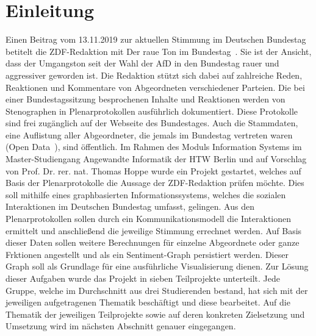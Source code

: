 \section{Einleitung}\label{sec:01_01_einleitung}
Einen Beitrag vom 13.11.2019 zur aktuellen Stimmung im Deutschen Bundestag betitelt die ZDF-Redaktion mit \glqq Der raue Ton im Bundestag\grqq{}~\cite{TonImBundesTag2019}. Sie ist der Ansicht, dass der Umgangston seit der Wahl der AfD in den Bundestag rauer und aggressiver geworden ist. Die Redaktion stützt sich dabei auf zahlreiche Reden, Reaktionen und Kommentare von Abgeordneten verschiedener Parteien.
Die bei einer Bundestagssitzung besprochenen Inhalte und Reaktionen werden von Stenographen in Plenarprotokollen ausführlich dokumentiert. Diese Protokolle sind frei zugänglich auf der Webseite des Bundestages. Auch die Stammdaten, eine Auflistung aller Abgeordneter, die jemals im Bundestag vertreten waren (Open Data~\cite{OpenData2019}), sind öffentlich.
Im Rahmen des Moduls Information Systems im Master-Studiengang Angewandte Informatik der HTW Berlin und auf Vorschlag von Prof. Dr. rer. nat. Thomas Hoppe wurde ein Projekt gestartet, welches auf Basis der Plenarprotokolle die Aussage der ZDF-Redaktion prüfen möchte. Dies soll mithilfe eines graphbasierten Informationssystems, welches die sozialen Interaktionen im Deutschen Bundestag umfasst, gelingen. Aus den Plenarprotokollen sollen durch ein Kommunikationsmodell die Interaktionen ermittelt und anschließend die jeweilige Stimmung errechnet werden. Auf Basis dieser Daten sollen weitere Berechnungen für einzelne Abgeordnete oder ganze Frktionen angestellt und als ein Sentiment-Graph persistiert werden. Dieser Graph soll als Grundlage für eine ausführliche Visualisierung dienen. 
Zur Lösung dieser Aufgaben wurde das Projekt in sieben Teilprojekte unterteilt. Jede Gruppe, welche im Durchschnitt aus drei Studierenden bestand, hat sich mit der jeweiligen aufgetragenen Thematik beschäftigt und diese bearbeitet. Auf die Thematik der jeweiligen Teilprojekte sowie auf deren konkreten Zielsetzung und Umsetzung wird im nächsten Abschnitt genauer eingegangen.
